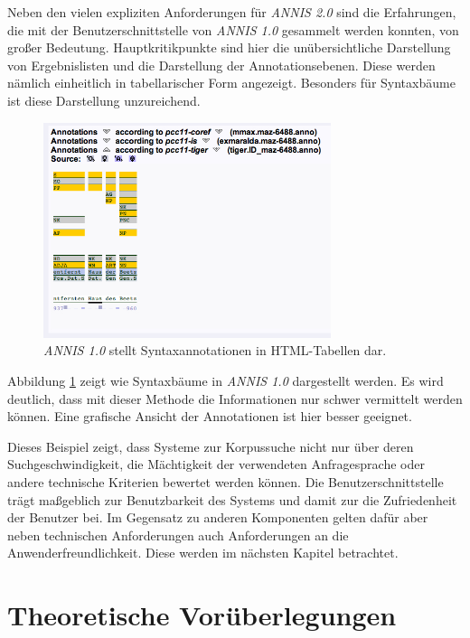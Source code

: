 Neben den vielen expliziten Anforderungen für \emph{ANNIS 2.0} sind die Erfahrungen, die mit der Benutzerschnittstelle von \emph{ANNIS 1.0} gesammelt werden konnten, von großer Bedeutung. Hauptkritikpunkte sind hier die unübersichtliche Darstellung von Ergebnislisten und die Darstellung der Annotationsebenen. Diese werden nämlich einheitlich in tabellarischer Form angezeigt. Besonders für Syntaxbäume ist diese Darstellung unzureichend.

\begin{figure}[H]
	\centering
	\includegraphics*[width=0.75\textwidth]{figures/DA/AnnisSyntaxTab.jpg}
	\caption{\emph{ANNIS 1.0} stellt Syntaxannotationen in HTML-Tabellen dar.}
	\label{fig:Syntaxbaum.ANNIS1}
\end{figure}

Abbildung \ref{fig:Syntaxbaum.ANNIS1} zeigt wie Syntaxbäume in \emph{ANNIS 1.0} dargestellt werden. Es wird deutlich, dass mit dieser Methode die Informationen nur schwer vermittelt werden können. Eine grafische Ansicht der Annotationen ist hier besser geeignet.

Dieses Beispiel zeigt, dass Systeme zur Korpussuche nicht nur über deren Suchgeschwindigkeit, die Mächtigkeit der verwendeten Anfragesprache oder andere technische Kriterien bewertet werden können. Die Benutzerschnittstelle trägt maßgeblich zur Benutzbarkeit des Systems und damit zur die Zufriedenheit der Benutzer bei. Im Gegensatz zu anderen Komponenten gelten dafür aber neben technischen Anforderungen auch Anforderungen an die Anwenderfreundlichkeit. Diese werden im nächsten Kapitel betrachtet.

\newpage
\section{Theoretische Vorüberlegungen}\label{sec:Usability}

